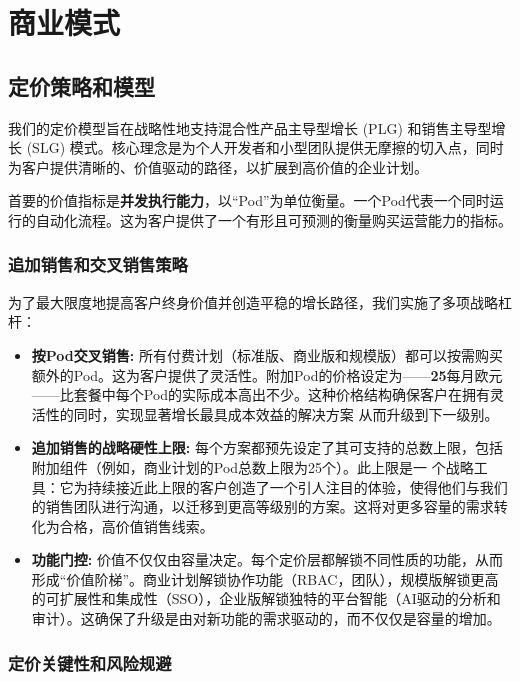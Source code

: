 \documentclass[11点, A4纸, 单面]{article}
\begin{document}
\section{商业模式}
\subsection{定价策略和模型}
我们的定价模型旨在战略性地支持混合性产品主导型增长 (PLG) 和销售主导型增长 (SLG) 模式。核心理念是为个人开发者和小型团队提供无摩擦的切入点，同时为客户提供清晰的、价值驱动的路径，以扩展到高价值的企业计划。

首要的价值指标是\textbf{并发执行能力}，以“Pod”为单位衡量。一个Pod代表一个同时运行的自动化流程。这为客户提供了一个有形且可预测的衡量购买运营能力的指标。

\subsubsection{追加销售和交叉销售策略}

为了最大限度地提高客户终身价值并创造平稳的增长路径，我们实施了多项战略杠杆：

\begin{itemize}
    \item \textbf{按Pod交叉销售:} 所有付费计划（标准版、商业版和规模版）都可以按需购买额外的Pod。这为客户提供了灵活性。附加Pod的价格设定为——\textbf{25}每月欧元——比套餐中每个Pod的实际成本高出不少。这种价格结构确保客户在拥有灵活性的同时，实现显著增长最具成本效益的解决方案 从而升级到下一级别。

    \item \textbf{追加销售的战略硬性上限:} 每个方案都预先设定了其可支持的总数上限，包括附加组件（例如，商业计划的Pod总数上限为25个）。此上限是一 个战略工具：它为持续接近此上限的客户创造了一个引人注目的体验，使得他们与我们的销售团队进行沟通，以迁移到更高等级别的方案。这将对更多容量的需求转化为合格，高价值销售线索。

    \item \textbf{功能门控:} 价值不仅仅由容量决定。每个定价层都解锁不同性质的功能，从而形成“价值阶梯”。商业计划解锁协作功能（RBAC，团队），规模版解锁更高的可扩展性和集成性（SSO），企业版解锁独特的平台智能（AI驱动的分析和审计）。这确保了升级是由对新功能的需求驱动的，而不仅仅是容量的增加。
\end{itemize}

\subsubsection{定价关键性和风险规避}
\end{document}
